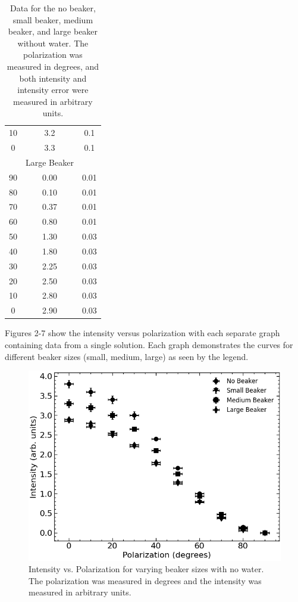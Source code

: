 \begin{table}[H]
\begin{center}
{\begin{tabular}{ccc}
			10 & 3.2 & 0.1 \\
			0 & 3.3 & 0.1 \\
			\hline
			& Large Beaker & \\
			\hline
			90 & 0.00 & 0.01 \\
			80 & 0.10 & 0.01 \\
			70 & 0.37 & 0.01 \\
			60 & 0.80 & 0.01 \\
			50 & 1.30 & 0.03 \\
			40 & 1.80 & 0.03 \\
			30 & 2.25 & 0.03 \\
			20 & 2.50 & 0.03 \\
			10 & 2.80 & 0.03 \\
			0 & 2.90 & 0.03 \\
			\bottomrule
		\end{tabular}}
	\end{center}
	\caption{Data for the no beaker, small beaker, medium beaker, and large beaker without water. The polarization was measured in degrees, and both intensity and intensity error were measured in arbitrary units.}
	\label{tab:no_water}
\end{table}

Figures 2-7 show the intensity versus polarization with each separate graph containing data from a single solution. Each graph demonstrates the curves for different beaker sizes (small, medium, large) as seen by the legend.

\begin{figure}[H]
    \begin{center}
        \includegraphics[width=\columnwidth]{../figures/no_water.png}
    \end{center}
    \caption{Intensity vs. Polarization for varying beaker sizes with no water. The polarization was measured in degrees and the intensity was measured in arbitrary units.}
    \label{fig:no_water}
\end{figure}

